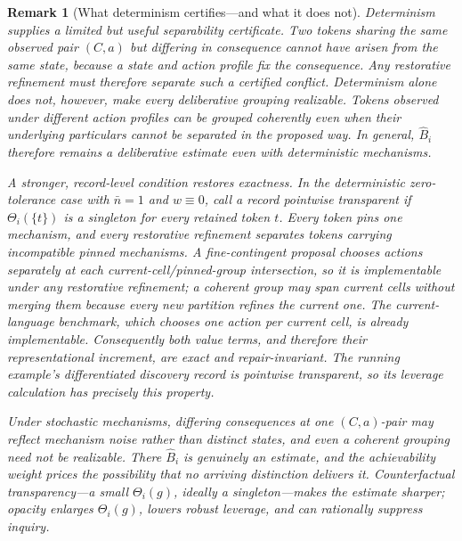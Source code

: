 \documentclass[11pt]{article}
\newtheorem{remark}[assumption]{Remark}
\theoremstyle{definition}
\begin{document}
\begin{remark}[What determinism certifies---and what it does not]
\label{rem:certification}
Determinism supplies a limited but useful separability certificate.
Two tokens sharing the same observed pair $(C,a)$ but differing in consequence cannot have arisen from the same state, because a state and action profile fix the consequence.
Any restorative refinement must therefore separate such a certified conflict.
Determinism alone does not, however, make every deliberative grouping realizable.
Tokens observed under different action profiles can be grouped coherently even when their underlying particulars cannot be separated in the proposed way.
In general, $\widehat B_i$ therefore remains a deliberative estimate even with deterministic mechanisms.

A stronger, record-level condition restores exactness.
In the deterministic zero-tolerance case with $\bar n=1$ and $w\equiv0$, call a record \emph{pointwise transparent} if $\Theta_i(\{t\})$ is a singleton for every retained token $t$.
Every token pins one mechanism, and every restorative refinement separates tokens carrying incompatible pinned mechanisms.
A fine-contingent proposal chooses actions separately at each current-cell/pinned-group intersection, so it is implementable under any restorative refinement; a coherent group may span current cells without merging them because every new partition refines the current one.
The current-language benchmark, which chooses one action per current cell, is already implementable.
Consequently both value terms, and therefore their representational increment, are exact and repair-invariant.
The running example's differentiated discovery record is pointwise transparent, so its leverage calculation has precisely this property.

Under stochastic mechanisms, differing consequences at one $(C,a)$-pair may reflect mechanism noise rather than distinct states, and even a coherent grouping need not be realizable.
There $\widehat B_i$ is genuinely an estimate, and the achievability weight prices the possibility that no arriving distinction delivers it.
Counterfactual transparency---a small $\Theta_i(g)$, ideally a singleton---makes the estimate sharper; opacity enlarges $\Theta_i(g)$, lowers robust leverage, and can rationally suppress inquiry.
\end{remark}
\end{document}
